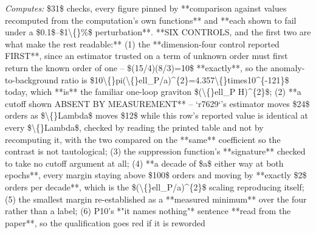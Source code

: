 \begin{description}
\emph{Computes:} \$31\$ checks, every figure pinned by **comparison against values recomputed from the computation's own functions** and **each shown to fail under a \$0.1\$--\$1\textbackslash\{\}\%\$ perturbation**. **SIX CONTROLS, and the first two are what make the rest readable:** (1) the **dimension-four control reported FIRST**, since an estimator trusted on a term of unknown order must first return the known order of one -- \$(15/4)(8/3)=10\$ **exactly**, so the anomaly-to-background ratio is \$10\textbackslash\{\}pi(\textbackslash\{\}ell\_P/a)\textasciicircum{}\{2\}=4.357\textbackslash\{\}times10\textasciicircum{}\{-121\}\$ today, which **is** the familiar one-loop graviton \$(\textbackslash\{\}ell\_P H)\textasciicircum{}\{2\}\$; (2) **a cutoff shown ABSENT BY MEASUREMENT** -- `r7629`'s estimator moves \$24\$ orders as \$\textbackslash\{\}Lambda\$ moves \$12\$ while this row's reported value is identical at every \$\textbackslash\{\}Lambda\$, checked by reading the printed table and not by recomputing it, with the two compared on the **same** coefficient so the contrast is not tautological; (3) the suppression function's **signature** checked to take no cutoff argument at all; (4) **a decade of \$a\$ either way at both epochs**, every margin staying above \$100\$ orders and moving by **exactly \$2\$ orders per decade**, which is the \$(\textbackslash\{\}ell\_P/a)\textasciicircum{}\{2\}\$ scaling reproducing itself; (5) the smallest margin re-established as a **measured minimum** over the four rather than a label; (6) P10's *"it names nothing"* sentence **read from the paper**, so the qualification goes red if it is reworded

\end{description}
